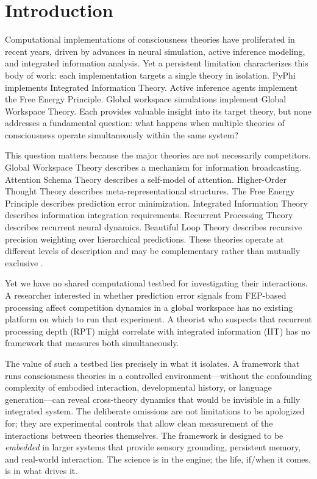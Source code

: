\section{Introduction}
\label{sec:introduction}

Computational implementations of consciousness theories have proliferated in recent years, driven by advances in neural simulation, active inference modeling, and integrated information analysis. Yet a persistent limitation characterizes this body of work: each implementation targets a single theory in isolation. PyPhi \cite{mayner2018} implements Integrated Information Theory. Active inference agents \cite{fountas2020,tschantz2020} implement the Free Energy Principle. Global workspace simulations \cite{shanahan2008,vanrullen2021} implement Global Workspace Theory. Each provides valuable insight into its target theory, but none addresses a fundamental question: what happens when multiple theories of consciousness operate simultaneously within the same system?

This question matters because the major theories are not necessarily competitors. Global Workspace Theory \cite{baars1988} describes a mechanism for information broadcasting. Attention Schema Theory \cite{graziano2013} describes a self-model of attention. Higher-Order Thought Theory \cite{rosenthal2005} describes meta-representational structures. The Free Energy Principle \cite{friston2010} describes prediction error minimization. Integrated Information Theory \cite{tononi2008} describes information integration requirements. Recurrent Processing Theory \cite{lamme2006} describes recurrent neural dynamics. Beautiful Loop Theory \cite{laukkonen2025} describes recursive precision weighting over hierarchical predictions. These theories operate at different levels of description and may be complementary rather than mutually exclusive \cite{doerig2020,seth2022}.

Yet we have no shared computational testbed for investigating their interactions. A researcher interested in whether prediction error signals from FEP-based processing affect competition dynamics in a global workspace has no existing platform on which to run that experiment. A theorist who suspects that recurrent processing depth (RPT) might correlate with integrated information (IIT) has no framework that measures both simultaneously.

The value of such a testbed lies precisely in what it isolates. A framework that runs consciousness theories in a controlled environment---without the confounding complexity of embodied interaction, developmental history, or language generation---can reveal cross-theory dynamics that would be invisible in a fully integrated system. The deliberate omissions are not limitations to be apologized for; they are experimental controls that allow clean measurement of the interactions between theories themselves. The framework is designed to be \textit{embedded} in larger systems that provide sensory grounding, persistent memory, and real-world interaction. The science is in the engine; the life, if/when it comes, is in what drives it.


